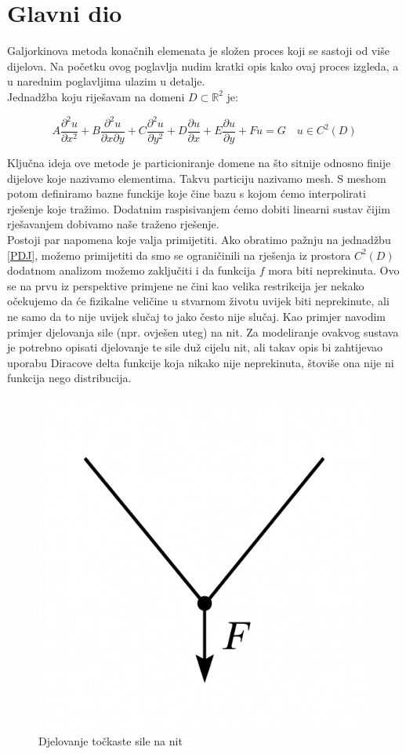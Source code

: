 \documentclass[zavrsnirad]{../fer}
\begin{document}
\chapter{Glavni dio}
\label{pog:glavni_dio}
Galjorkinova metoda konačnih elemenata je složen proces
koji se sastoji od više dijelova. Na početku ovog 
poglavlja nudim kratki opis kako ovaj proces izgleda, a
u narednim poglavljima ulazim u detalje.
\bigskip
\\ 
Jednadžba koju riješavam na domeni $D \subset \mathbb{R}^2$ je:

\begin{equation}
	\label{PDJ}
  A \frac{\partial^2 u}{\partial x^2}
	+ B \frac{\partial^2 u}{\partial x \partial y}
	+ C \frac{\partial^2 u}{\partial y^2}
	+ D \frac{\partial u}{\partial x}
	+ E \frac{\partial u}{\partial y}
	+ F u = G
  \quad u \in C^2(D)
\end{equation}

Ključna ideja ove metode je particioniranje domene na
što sitnije odnosno finije dijelove koje nazivamo elementima.
Takvu particiju nazivamo mesh. S meshom potom definiramo
bazne funckije koje čine bazu s kojom ćemo interpolirati
rješenje koje tražimo. Dodatnim raspisivanjem ćemo dobiti
linearni sustav čijim rješavanjem dobivamo naše traženo
rješenje.
\bigskip
\\ 
Postoji par napomena koje valja primijetiti. Ako obratimo
pažnju na jednadžbu \eqref{PDJ}, možemo primijetiti da smo
se ograničinili na rješenja iz prostora $C^2(D)$ dodatnom analizom
možemo zaključiti i da funkcija $f$ mora biti neprekinuta.
Ovo se na prvu iz perspektive primjene ne čini kao velika 
restrikcija jer nekako očekujemo da će fizikalne veličine u 
stvarnom životu uvijek biti neprekinute, ali ne samo da to nije
uvijek slučaj to jako često nije slučaj. Kao primjer navodim 
primjer djelovanja sile (npr. ovješen uteg) na nit. Za modeliranje
ovakvog sustava je potrebno opisati djelovanje te sile duž
cijelu nit, ali takav opis bi zahtijevao uporabu Diracove delta 
funkcije koja nikako nije neprekinuta, štoviše ona nije
ni funkcija nego distribucija.

\begin{figure}[htb]
	\centering
	\includegraphics[width=0.38\linewidth]{Figures/nit.png}
	\caption{Djelovanje točkaste sile na nit}
	\label{nit}
\end{figure}
\end{document}
